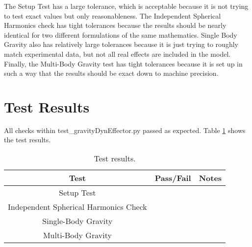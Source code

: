 The Setup Test has a large tolerance, which is acceptable because it is not trying to test exact values but only reasonableness. The Independent Spherical Harmonics check has tight tolerances because the results should be nearly identical for two different formulations of the same mathematics. Single Body Gravity also has relatively large tolerances because it is just trying to roughly match experimental data, but not all real effects are included in the model. Finally, the Multi-Body Gravity test has tight tolerances because it is set up in such a way that the results should be exact down to machine precision.

\section{Test Results}

All checks within test\_gravityDynEffector.py passed as expected. Table \ref{tab:results} shows the test results.\\

\begin{table}[htbp]
	\caption{Test results.}
	\label{tab:results}
	\centering \fontsize{10}{10}\selectfont
	\begin{tabular}{c | c | c  } %
		\hline
		\textbf{Test} 				    & \textbf{Pass/Fail} 						   			           & \textbf{Notes} 									\\ \hline
		Setup Test       			  	&      & 			 \\
		Independent Spherical Harmonics Check  &                  &  \\ 
		Single-Body Gravity		   	&                  &  \\ 
		Multi-Body Gravity			 &  			 	 &   			   \\ \hline
	\end{tabular}
\end{table}